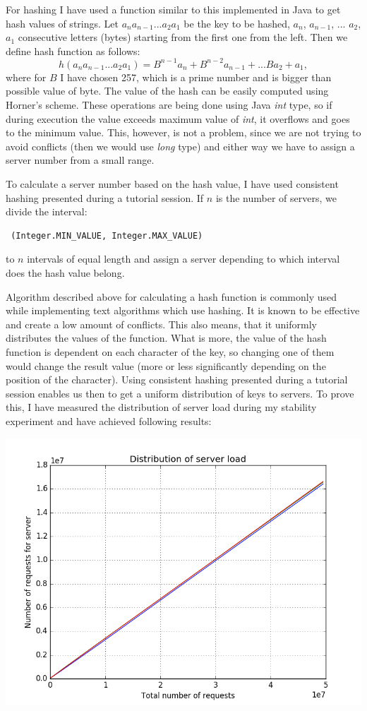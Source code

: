 \documentclass[11pt]{article}
\begin{document}
For hashing I have used a function similar to this implemented in Java to get hash values of strings. Let $a_na_{n-1}...a_2a_1$ be the key to be hashed, $a_n$, $a_{n-1}$, ... $a_2$, $a_1$ consecutive letters (bytes) starting from the first one from the left. Then we define hash function as follows:
$$h(a_na_{n-1}...a_2a_1) = B^{n-1}a_n + B^{n-2}a_{n-1} + ... Ba_2 + a_1,$$
where for $B$ I have chosen 257, which is a prime number and is bigger than possible value of byte. The value of the hash can be easily computed using Horner's scheme. These operations are being done using Java {\it int} type, so if during execution the value exceeds maximum value of {\it int}, it overflows and goes to the minimum value. This, however, is not a problem, since we are not trying to avoid conflicts (then we would use {\it long} type) and either way we have to assign a server number from a small range. 

To calculate a server number based on the hash value, I have used consistent hashing presented during a tutorial session. If $n$ is the number of servers, we divide the interval: \begin{verbatim} (Integer.MIN_VALUE, Integer.MAX_VALUE)\end{verbatim} to $n$ intervals of equal length and assign a server depending to which interval does the hash value belong.

Algorithm described above for calculating a hash function is commonly used while implementing text algorithms which use hashing. It is known to be effective and create a low amount of conflicts. This also means, that it uniformly distributes the values of the function. What is more, the value of the hash function is dependent on each character of the key, so changing one of them would change the result value (more or less significantly depending on the position of the character). Using consistent hashing presented during a tutorial session enables us then to get a uniform distribution of keys to servers. To prove this, I have measured the distribution of server load during my stability experiment and have achieved following results:

\includegraphics[scale=0.6]{servers_distribution.png}
\end{document}
